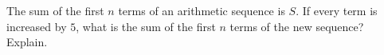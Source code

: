 The sum of the first $n$ terms of an arithmetic sequence is $S$. If every term is increased by $5$, what is the sum of the first $n$ terms of the new sequence? Explain.
